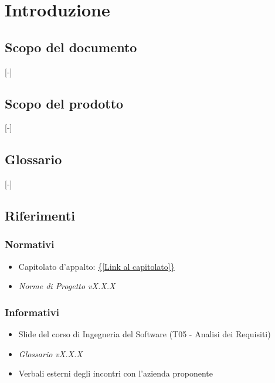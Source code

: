 \section{Introduzione}

\subsection{Scopo del documento}
[-]

\subsection{Scopo del prodotto}
[-]

\subsection{Glossario}
[-]

\subsection{Riferimenti}
\subsubsection{Normativi}
\begin{itemize}
	\item Capitolato d'appalto: \url{{[Link al capitolato]}}
	\item \textit{Norme di Progetto vX.X.X}
\end{itemize}

\subsubsection{Informativi}
\begin{itemize}
	\item Slide del corso di Ingegneria del Software (T05 - Analisi dei Requisiti)
	\item \textit{Glossario vX.X.X}
	\item Verbali esterni degli incontri con l'azienda proponente
\end{itemize}